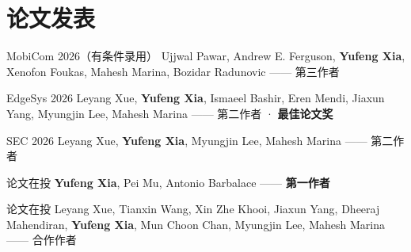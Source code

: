 \section{论文发表}
\vspace{2pt}

  {MobiCom 2026（有条件录用）}
  {Ujjwal Pawar, Andrew E. Ferguson, \textbf{Yufeng Xia}, Xenofon Foukas, Mahesh Marina, Bozidar Radunovic —— 第三作者}

  {EdgeSys 2026}
  {Leyang Xue, \textbf{Yufeng Xia}, Ismaeel Bashir, Eren Mendi, Jiaxun Yang, Myungjin Lee, Mahesh Marina —— 第二作者 · \textbf{最佳论文奖}}

  {SEC 2026}
  {Leyang Xue, \textbf{Yufeng Xia}, Myungjin Lee, Mahesh Marina —— 第二作者}

  {论文在投}
  {\textbf{Yufeng Xia}, Pei Mu, Antonio Barbalace —— \textbf{第一作者}}

  {论文在投}
  {Leyang Xue, Tianxin Wang, Xin Zhe Khooi, Jiaxun Yang, Dheeraj Mahendiran, \textbf{Yufeng Xia}, Mun Choon Chan, Myungjin Lee, Mahesh Marina —— 合作作者}
